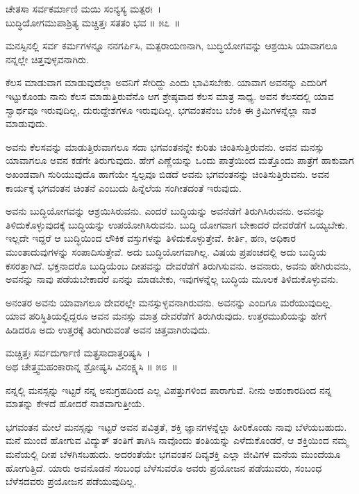 \begin{shloka}
ಚೇತಸಾ ಸರ್ವಕರ್ಮಾಣಿ ಮಯಿ ಸಂನ್ಯಸ್ಯ ಮತ್ಪರಃ~।\\ಬುದ್ಧಿಯೋಗಮುಪಾಶ್ರಿತ್ಯ ಮಚ್ಚಿತ್ತಃ ಸತತಂ ಭವ \hfill॥ ೫೭~॥
\end{shloka}

\begin{artha}
ಮನಸ್ಸಿನಲ್ಲಿ ಸರ್ವ ಕರ್ಮಗಳನ್ನೂ ನನಗರ್ಪಿಸಿ, ಮತ್ಪರಾಯಣನಾಗಿ, ಬುದ್ಧಿಯೋಗವನ್ನು ಆಶ್ರಯಿಸಿ ಯಾವಾಗಲೂ ನನ್ನಲ್ಲೇ ಚಿತ್ತವುಳ್ಳವನಾಗಿರು.
\end{artha}

ಕೆಲಸ ಮಾಡುವಾಗ ಮಾಡುವುದೆಲ್ಲಾ ಅವನಿಗೆ ಸೇರಿದ್ದು ಎಂದು ಭಾವಿಸಬೇಕು. ಯಾವಾಗ ಅವನನ್ನು ಎದುರಿಗೆ ಇಟ್ಟುಕೊಂಡು ನಾನು ಕೆಲಸ ಮಾಡುತ್ತಿರುವೆನೊ ಆಗ ಶ್ರೇಷ್ಠವಾದ ಕೆಲಸ ಮಾತ್ರ ಸಾಧ್ಯ. ಅವನ ಕೆಲಸದಲ್ಲಿ ಯಾವ ಸ್ವಾರ್ಥವೂ ಇರುವುದಿಲ್ಲ, ದುರುದ್ದೇಶಗಳೂ ಇರುವುದಿಲ್ಲ. ಭಗವಂತನೆಂಬ ಬೆಂಕಿ ಈ ಕ್ರಿಮಿಗಳನ್ನೆಲ್ಲಾ ನಾಶ ಮಾಡುವುದು.

ಅವನು ಕೆಲಸವನ್ನು ಮಾಡುತ್ತಿರುವಾಗಲೂ ಸದಾ ಭಗವಂತನನ್ನೇ ಕುರಿತು ಚಿಂತಿಸುತ್ತಿರುವನು. ಅವನ ಮನಸ್ಸು ಯಾವಾಗಲೂ ಅವನ ಕಡೆಗೇ ತಿರುಗುವುದು. ಹೇಗೆ ಎಣ್ಣೆಯನ್ನು ಒಂದು ಪಾತ್ರೆಯಿಂದ ಮತ್ತೊಂದು ಪಾತ್ರೆಗೆ ಹಾಕುವಾಗ ಅಖಂಡವಾಗಿ ಸುರಿಯುವುದೊ ಹಾಗೆಯೇ ಸ್ವಲ್ಪವೂ ಬಿಡದೆ ಅವನು ಭಗವಂತನನ್ನು ಚಿಂತಿಸುತ್ತಿರುವನು. ಅವನ ಕಾರ್ಯಕ್ಕೆ ಭಗವಂತನ ಚಿಂತನೆ ಎಂಬುದು ಹಿನ್ನೆಲೆಯ ಸಂಗೀತದಂತೆ ಇರುವುದು.

ಅವನು ಬುದ್ಧಿಯೋಗವನ್ನು ಆಶ್ರಯಿಸಿರುವನು. ಎಂದರೆ ಬುದ್ಧಿಯನ್ನು ಅವನೆಡೆಗೆ ತಿರುಗಿಸಿರುವನು. ಅವನನ್ನು ತಿಳಿದುಕೊಳ್ಳುವುದಕ್ಕೆ ಬುದ್ಧಿಯನ್ನು ಉಪಯೋಗಿಸಿರುವನು. ಬುದ್ಧಿ ಯೋಗವಾಗ ಬೇಕಾದರೆ ದೇವರೆಡೆಗೆ ಒಯ್ಯಬೇಕು. ಇಲ್ಲದೇ ಇದ್ದರೆ ಆ ಬುದ್ಧಿಯಿಂದ ಲೌಕಿಕ ವಸ್ತುಗಳನ್ನು ತಿಳಿದುಕೊಳ್ಳುತ್ತೇವೆ. ಕೀರ್ತಿ, ಹಣ, ಅಧಿಕಾರ ಮುಂತಾದುವುಗಳನ್ನು ಸಂಪಾದಿಸುತ್ತೇವೆ. ಅದು ಬುದ್ಧಿಯೋಗವಾಗಿಲ್ಲ. ವಿಷಯ ಪ್ರಪಂಚದಲ್ಲಿ ಅದು ಬುದ್ಧಿಯ ಕಸರತ್ತಾಗಿದೆ. ಭಕ್ತನಾದರೊ ಬುದ್ಧಿಯೆಂಬ ದೀಪವನ್ನು ದೇವರೆಡೆಗೆ ತಿರುಗಿಸುವನು. ಅವನಾರು, ಅವನು ಹೇಗಿರುವನು, ಅವನನ್ನು ನಾವು ಪಡೆಯಬೇಕಾದರೆ ಏನನ್ನು ಮಾಡಬೇಕು, ಇವುಗಳನ್ನೆಲ್ಲ ಬುದ್ಧಿಯ ಮೂಲಕ ತಿಳಿದುಕೊಳ್ಳುವನು.

ಅನಂತರ ಅವನು ಯಾವಾಗಲೂ ದೇವರಲ್ಲೇ ಮನಸ್ಸುಳ್ಳವನಾಗಿರುವನು. ಅವನನ್ನು ಎಂದಿಗೂ ಮರೆಯುವುದಿಲ್ಲ. ಯಾವ ಪರಿಸ್ಥಿತಿಯಲ್ಲಿದ್ದರೂ ಅವನ ಮನಸ್ಸು ಮಾತ್ರ ದೇವರೆಡೆಗೆ ತಿರುಗಿರುವುದು. ಉತ್ತರಮುಖಿಯನ್ನು ಹೇಗೆ ಹಿಡಿದರೂ ಅದು ಉತ್ತರಕ್ಕೆ ತಿರುಗಿರುವಂತೆ ಅವನ ಚಿತ್ತವಾಗಿರುವುದು.

\begin{shloka}
ಮಚ್ಚಿತ್ತಃ ಸರ್ವದುರ್ಗಾಣಿ ಮತ್ಪ್ರಸಾದಾತ್ತರಿಷ್ಯಸಿ~।\\ಅಥ ಚೇತ್ತ್ವಮಹಂಕಾರಾನ್ನ ಶ್ರೋಷ್ಯಸಿ ವಿನಂಕ್ಷ್ಯಸಿ \hfill॥ ೫೮~॥
\end{shloka}

\begin{artha}
ನನ್ನಲ್ಲಿ ಮನಸ್ಸನ್ನು ಇಟ್ಟರೆ ನನ್ನ ಅನುಗ್ರಹದಿಂದ ಎಲ್ಲ ವಿಪತ್ತುಗಳಿಂದ ಪಾರಾಗುವೆ. ನೀನು ಅಹಂಕಾರದಿಂದ ನನ್ನ ಮಾತನ್ನು ಕೇಳದೆ ಹೋದರೆ ನಾಶವಾಗುತ್ತೀಯೆ.
\end{artha}

ಭಗವಂತನ ಮೇಲೆ ಮನಸ್ಸನ್ನು ಇಟ್ಟರೆ ಅವನ ಪವಿತ್ರತೆ, ಶಕ್ತಿ ಜ್ಞಾನಗಳನ್ನೆಲ್ಲಾ ಹೀರಿಕೊಂಡು ನಾವು ಬೆಳೆಯಬಹುದು. ಮನೆ ಮುಂದೆ ಹೋಗುವ ವಿದ್ಯುತ್ ತಂತಿಗೆ ತಾಗಿಸಿ ನಾವೊಂದು ತಂತಿಯನ್ನು ಎಳೆದುಕೊಂಡರೆ, ಆ ಶಕ್ತಿಯಿಂದ ನಮ್ಮ ಮನೆಯಲ್ಲಿ ದೀಪ ಬೆಳಗಿಸಬಹುದು. ಅದರಂತೆಯೇ ಭಗವಂತನ ದಿವ್ಯಶಕ್ತಿ ಎಲ್ಲಾ ಜೀವಿಗಳ ಮನೆಯ ಮುಂದೆಯೂ ಹೋಗುತ್ತಿದೆ. ಯಾರು ಅವನೊಡನೆ ಸಂಬಂಧ ಬೆಳೆಸುವರೊ ಅವರು ಪ್ರಯೋಜನ ಪಡೆಯುವರು, ಸಂಬಂಧ ಬೆಳೆಸದವರು ಪ್ರಯೋಜನ ಪಡೆಯುವುದಿಲ್ಲ.

